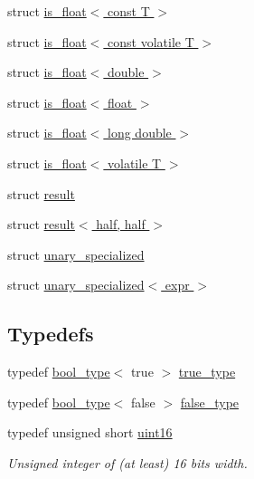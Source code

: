 \begin{DoxyCompactItemize}
struct \hyperlink{structhalf__float_1_1detail_1_1is__float_3_01const_01T_01_4}{is\+\_\+float$<$ const T $>$}
\item 
struct \hyperlink{structhalf__float_1_1detail_1_1is__float_3_01const_01volatile_01T_01_4}{is\+\_\+float$<$ const volatile T $>$}
\item 
struct \hyperlink{structhalf__float_1_1detail_1_1is__float_3_01double_01_4}{is\+\_\+float$<$ double $>$}
\item 
struct \hyperlink{structhalf__float_1_1detail_1_1is__float_3_01float_01_4}{is\+\_\+float$<$ float $>$}
\item 
struct \hyperlink{structhalf__float_1_1detail_1_1is__float_3_01long_01double_01_4}{is\+\_\+float$<$ long double $>$}
\item 
struct \hyperlink{structhalf__float_1_1detail_1_1is__float_3_01volatile_01T_01_4}{is\+\_\+float$<$ volatile T $>$}
\item 
struct \hyperlink{structhalf__float_1_1detail_1_1result}{result}
\item 
struct \hyperlink{structhalf__float_1_1detail_1_1result_3_01half_00_01half_01_4}{result$<$ half, half $>$}
\item 
struct \hyperlink{structhalf__float_1_1detail_1_1unary__specialized}{unary\+\_\+specialized}
\item 
struct \hyperlink{structhalf__float_1_1detail_1_1unary__specialized_3_01expr_01_4}{unary\+\_\+specialized$<$ expr $>$}
\end{DoxyCompactItemize}
\subsection*{Typedefs}
\begin{DoxyCompactItemize}
\item 
typedef \hyperlink{structhalf__float_1_1detail_1_1bool__type}{bool\+\_\+type}$<$ true $>$ \hyperlink{namespacehalf__float_1_1detail_a5e245748a3cc20e348dd92383d99d03c}{true\+\_\+type}
\item 
typedef \hyperlink{structhalf__float_1_1detail_1_1bool__type}{bool\+\_\+type}$<$ false $>$ \hyperlink{namespacehalf__float_1_1detail_a04d0449ab22bc6d1cfb2f31a8271945c}{false\+\_\+type}
\item 
typedef unsigned short \hyperlink{namespacehalf__float_1_1detail_a239ec58092b4e4849b444baee1a01088}{uint16}
\begin{DoxyCompactList}\small\item\em Unsigned integer of (at least) 16 bits width. \end{DoxyCompactList}\end{DoxyCompactItemize}
